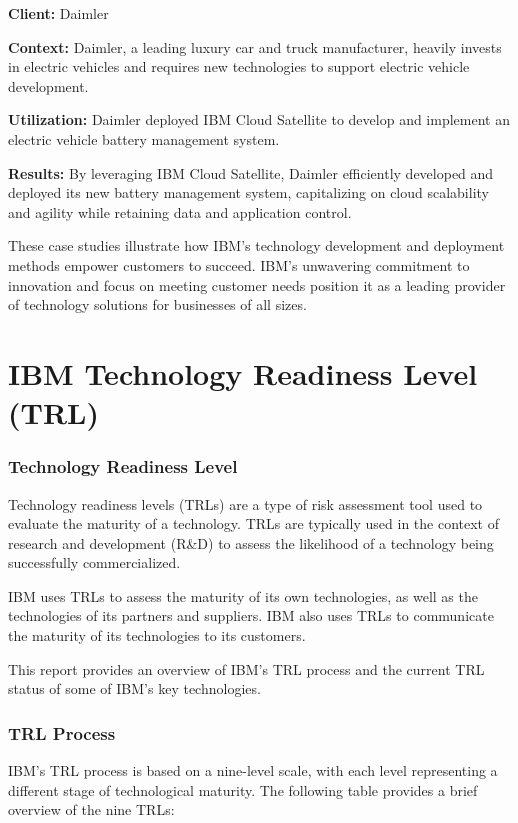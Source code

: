 \textbf{Client:} Daimler

\textbf{Context:} Daimler, a leading luxury car and truck manufacturer, heavily invests in electric vehicles and requires new technologies to support electric vehicle development.

\textbf{Utilization:} Daimler deployed IBM Cloud Satellite to develop and implement an electric vehicle battery management system.

\textbf{Results:} By leveraging IBM Cloud Satellite, Daimler efficiently developed and deployed its new battery management system, capitalizing on cloud scalability and agility while retaining data and application control.

These case studies illustrate how IBM's technology development and deployment methods empower customers to succeed. IBM's unwavering commitment to innovation and focus on meeting customer needs position it as a leading provider of technology solutions for businesses of all sizes.

\section{IBM Technology Readiness Level (TRL)}
\subsubsection{Technology Readiness Level}

Technology readiness levels (TRLs) are a type of risk assessment tool used to evaluate the maturity of a technology. TRLs are typically used in the context of research and development (R\&D) to assess the likelihood of a technology being successfully commercialized.

IBM uses TRLs to assess the maturity of its own technologies, as well as the technologies of its partners and suppliers. IBM also uses TRLs to communicate the maturity of its technologies to its customers.

This report provides an overview of IBM's TRL process and the current TRL status of some of IBM's key technologies.

\subsubsection{TRL Process}

IBM's TRL process is based on a nine-level scale, with each level representing a different stage of technological maturity. The following table provides a brief overview of the nine TRLs:

